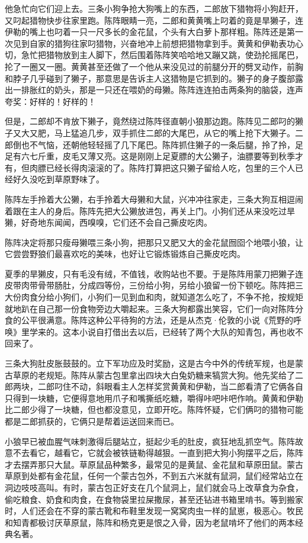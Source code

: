 \par 他急忙向它们迎上去。三条小狗争抢大狗嘴上的东西，二郎放下猎物将小狗赶开，又叼起猎物快步往家里跑。陈阵眼睛一亮，二郎和黄黄嘴上叼着的竟是旱獭子，连伊勒的嘴上也叼着一只一尺多长的金花鼠，个头有大白萝卜那样粗。陈阵还是第一次见到自家的猎狗往家叼猎物，兴奋地冲上前想把猎物拿到手。黄黄和伊勒表功心切，急忙把猎物放到主人脚下，然后围着陈阵笑哈哈地又蹦又跳，使劲抡摇尾巴，抡了一圈又一圈。黄黄甚至还做了一个他从来没见过的前腿分开的劈叉动作，前胸和脖子几乎碰到了獭子，那意思是告诉主人这猎物是它抓到的。獭子的身子腹部露出一排胀红的奶头，那是一只还在喂奶的母獭。陈阵连连拍击两条狗的脑袋，连声夸奖：好样的！好样的！
\par 但是，二郎却不肯放下獭子，竟然绕过陈阵径直朝小狼那边跑。陈阵见二郎叼的獭子又大又肥，马上猛追几步，双手抓住二郎的大尾巴，从它的嘴上抢下大獭子。二郎倒也不气恼，还朝他轻轻摇了几下尾巴。陈阵抓住獭子的一条后腿，拎了拎，足足有六七斤重，皮毛又薄又亮。这是刚刚上足夏膘的大公獭子，油膘要等到秋季才有，但肉膘已经长得肉滚滚的了。陈阵打算把这只獭子留给人吃，包里的三个人已经好久没吃到草原野味了。
\par 陈阵左手拎着大公獭，右手拎着大母獭和大鼠，兴冲冲往家走，三条大狗互相逗闹着跟在主人的身后。陈阵先把大公獭放进包，再关上门。小狗们还从来没吃过旱獭，好奇地东闻闻，西嗅嗅，它们还不会自己撕皮吃肉。
\par 陈阵决定将那只瘦母獭喂三条小狗，把那只又肥又大的金花鼠囫囵个地喂小狼，让它尝尝野狼们最喜欢吃的美味，也好让它锻炼锻炼自己撕皮吃肉。
\par 夏季的旱獭皮，只有毛没有绒，不值钱，收购站也不要。于是陈阵用蒙刀把獭子连皮带肉带骨带肠肚，分成四等份，三份给小狗，另给小狼留一份下顿吃。陈阵把三大份肉食分给小狗们，小狗们一见到血和肉，就知道怎么吃了，不争不抢，按规矩就地趴在自己那一份食物旁边大嚼起来。三条大狗都露出笑容，它们一向对陈阵分食的公平很满意。陈阵这种公平待狗的方法，还是从杰克·伦敦的小说《荒野的呼唤》里学来的。这本小说自打借出去以后，已经转了两个大队的知青包，再也收不回来了。
\par 三条大狗肚皮胀鼓鼓的。立下军功应及时奖励，这是古今中外的传统军规，也是蒙古草原的老规矩。陈阵从蒙古包里拿出四块大白兔奶糖来犒赏大狗。他先奖给了二郎两块，二郎叼住不动，斜眼看主人怎样奖赏黄黄和伊勒，当二郎看清了它俩各自只得到一块糖，它便得意地用爪子和嘴撕纸吃糖，嚼得咔吧咔吧作响。黄黄和伊勒比二郎少得了一块糖，但也都没意见，立即开吃。陈阵怀疑，它们俩叼的猎物可能都是二郎抓获的，它俩只是帮着运送回来而已。
\par 小狼早已被血腥气味刺激得后腿站立，挺起少毛的肚皮，疯狂地乱抓空气。陈阵故意不去看它，越看它，它就会被铁链勒得越狠。一直到把大狗小狗摆平之后，陈阵才去摆弄那只大鼠。草原鼠品种繁多，最常见的是黄鼠、金花鼠和草原田鼠。蒙古草原到处都有金花鼠，任何一个蒙古包外，不到五六米就有鼠洞，鼠们经常站立在洞边吱吱高叫。有时，蒙古包正好支在几个鼠洞上，鼠们就会马上改草食为杂食，偷吃粮食、奶食和肉食，在食物袋里拉屎撒尿，甚至还钻进书箱里啃书。等到搬家时，人们还会在不穿的蒙古靴和布鞋里发现一窝窝肉虫一样的鼠崽，极恶心。牧民和知青都极讨厌草原鼠，陈阵和杨克更是恨之入骨，因为老鼠啃坏了他们的两本经典名著。
